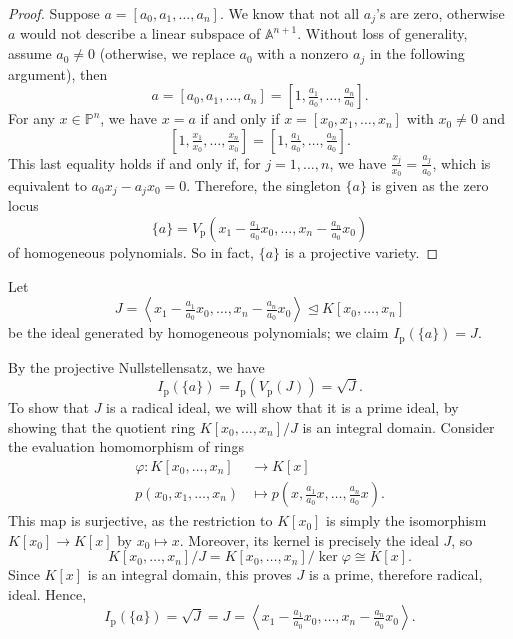 \documentclass[12pt]{article}
\renewcommand{\phi}{\varphi}
\newcommand{\<}{\langle}
\renewcommand{\>}{\rangle}
\newcommand{\isom}{\cong}
\newcommand{\A}{\mathbb{A}}
\renewcommand{\P}{\mathbb{P}}
\newcommand{\teq}{\trianglelefteq}
\newcommand{\Ip}{I_{\mathrm{p}}}
\newcommand{\Vp}{V_{\mathrm{p}}}
\newcommand{\rad}{\sqrt}
\begin{document}
\begin{proof}
    Suppose $a = [a_0, a_1, \dots, a_n]$. We know that not all $a_j$'s are zero, otherwise $a$ would not describe a linear subspace of $\A^{n+1}$. Without loss of generality, assume $a_0 \ne 0$ (otherwise, we replace $a_0$ with a nonzero $a_j$ in the following argument), then
    \[
        a = [a_0, a_1, \dots, a_n] = \left[1, \tfrac{a_1}{a_0}, \dots, \tfrac{a_n}{a_0}\right].
    \]
    For any $x \in \P^n$, we have $x = a$ if and only if $x = [x_0, x_1, \dots, x_n]$ with $x_0 \ne 0$ and
    \[
        \left[1, \tfrac{x_1}{x_0}, \dots, \tfrac{x_n}{x_0}\right] = \left[1, \tfrac{a_1}{a_0}, \dots, \tfrac{a_n}{a_0}\right].
    \]
    This last equality holds if and only if, for $j = 1, \dots, n$, we have $\tfrac{x_j}{x_0} = \tfrac{a_j}{a_0}$, which is equivalent to $a_0x_j - a_jx_0 = 0$. Therefore, the singleton $\{a\}$ is given as the zero locus
    \[
        \{a\} = \Vp\left(x_1 - \tfrac{a_1}{a_0}x_0, \dots, x_n - \tfrac{a_n}{a_0}x_0\right)
    \]
    of homogeneous polynomials. So in fact, $\{a\}$ is a projective variety. 

\end{proof}

Let
\[
    J = \left\<x_1 - \tfrac{a_1}{a_0}x_0, \dots, x_n - \tfrac{a_n}{a_0}x_0\right\> \teq K[x_0, \dots, x_n]
\]
be the ideal generated by homogeneous polynomials; we claim $\Ip(\{a\}) = J$.

    By the projective Nullstellensatz, we have
\[
    \Ip(\{a\}) = \Ip(\Vp(J)) = \rad{J}.
\]
To show that $J$ is a radical ideal, we will show that it is a prime ideal, by showing that the quotient ring $K[x_0, \dots, x_n]/J$ is an integral domain. Consider the evaluation homomorphism of rings
\begin{align*}
    \phi : K[x_0, \dots, x_n] &\to K[x] \\
        p(x_0, x_1, \dots, x_n) &\mapsto p\left(x, \tfrac{a_1}{a_0}x, \dots, \tfrac{a_n}{a_0}x\right).
\end{align*}
This map is surjective, as the restriction to $K[x_0]$ is simply the isomorphism $K[x_0] \to K[x]$ by $x_0 \mapsto x$. Moreover, its kernel is precisely the ideal $J$, so
\[
    K[x_0, \dots, x_n]/J = K[x_0, \dots, x_n]/\ker\phi \isom K[x].
\]
Since $K[x]$ is an integral domain, this proves $J$ is a prime, therefore radical, ideal. Hence,
\[
    \Ip(\{a\}) = \rad{J} = J = \left\<x_1 - \tfrac{a_1}{a_0}x_0, \dots, x_n - \tfrac{a_n}{a_0}x_0\right\>.
\]
\end{document}
